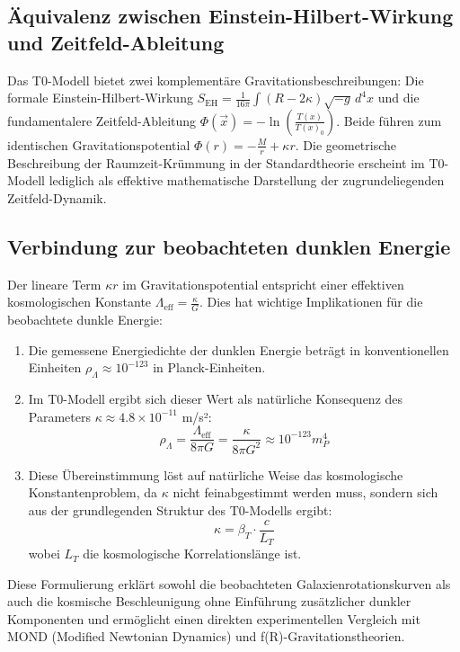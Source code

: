 \documentclass[12pt,a4paper]{article}
\newcommand{\Tfield}{T(x)}
\begin{document}
	\subsection*{Äquivalenz zwischen Einstein-Hilbert-Wirkung und Zeitfeld-Ableitung}
	
	Das T0-Modell bietet zwei komplementäre Gravitationsbeschreibungen: Die formale Einstein-Hilbert-Wirkung $S_{\mathrm{EH}} = \frac{1}{16\pi} \int (R - 2\kappa) \sqrt{-g} \, d^4x$ und die fundamentalere Zeitfeld-Ableitung $\Phi(\vec{x}) = -\ln\left(\frac{\Tfield}{\Tfield_0}\right)$. Beide führen zum identischen Gravitationspotential $\Phi(r) = -\frac{M}{r} + \kappa r$. Die geometrische Beschreibung der Raumzeit-Krümmung in der Standardtheorie erscheint im T0-Modell lediglich als effektive mathematische Darstellung der zugrundeliegenden Zeitfeld-Dynamik.
	\subsection*{Verbindung zur beobachteten dunklen Energie}
	
	Der lineare Term $\kappa r$ im Gravitationspotential entspricht einer effektiven kosmologischen Konstante $\Lambda_{\text{eff}} = \frac{\kappa}{G}$. Dies hat wichtige Implikationen für die beobachtete dunkle Energie:
	
	\begin{enumerate}
		\item Die gemessene Energiedichte der dunklen Energie beträgt in konventionellen Einheiten $\rho_\Lambda \approx 10^{-123}$ in Planck-Einheiten.
		
		\item Im T0-Modell ergibt sich dieser Wert als natürliche Konsequenz des Parameters $\kappa \approx 4.8 \times 10^{-11}$ m/s²:
		\[
		\rho_\Lambda = \frac{\Lambda_{\text{eff}}}{8\pi G} = \frac{\kappa}{8\pi G^2} \approx 10^{-123} m_P^4
		\]
		
		\item Diese Übereinstimmung löst auf natürliche Weise das kosmologische Konstantenproblem, da $\kappa$ nicht feinabgestimmt werden muss, sondern sich aus der grundlegenden Struktur des T0-Modells ergibt:
		\[
		\kappa = \beta_T \cdot \frac{c}{L_T}
		\]
		wobei $L_T$ die kosmologische Korrelationslänge ist.
	\end{enumerate}
	
	Diese Formulierung erklärt sowohl die beobachteten Galaxienrotationskurven als auch die kosmische Beschleunigung ohne Einführung zusätzlicher dunkler Komponenten und ermöglicht einen direkten experimentellen Vergleich mit MOND (Modified Newtonian Dynamics) und f(R)-Gravitationstheorien.
	
\end{document}
